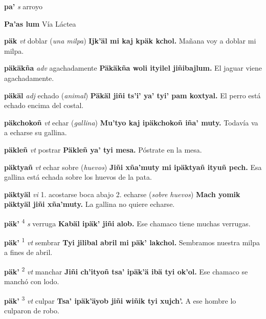 \documentclass[10pt]{scrbook}
\newcommand{\entry}[1]{\textbf{#1}}
\newcommand{\onedefinition}[1]{#1.}
\newcommand{\defsuperscript}[1]{\textsuperscript{#1}}
\newcommand{\partofspeech}[1]{\textit{#1}}
\newcommand{\spanishtranslation}[1]{#1}
\newcommand{\clarification}[1]{(\textit{#1})}
\newcommand{\cholexample}[1]{\textbf{#1}}
\newcommand{\exampletranslation}[1]{#1}
\begin{document}
\begin{multicols}{2}
\entry{pa'}
\partofspeech{s}
\spanishtranslation{arroyo}

\entry{Pa'as lum}
\spanishtranslation{Vía Láctea}

\entry{päk}
\partofspeech{vt}
\spanishtranslation{doblar}
\clarification{una milpa}
\cholexample{Ijk'äl mi kaj kpäk kchol.}
\exampletranslation{Mañana voy a doblar mi milpa.}

\entry{päkäkña}
\partofspeech{adv}
\spanishtranslation{agachadamente}
\cholexample{Päkäkña woli ityilel jiñibajlum.}
\exampletranslation{El jaguar viene agachadamente.}

\entry{päkäl}
\partofspeech{adj}
\spanishtranslation{echado}
\clarification{animal}
\cholexample{Päkäl jiñi ts'i' ya' tyi' pam koxtyal.}
\exampletranslation{El perro está echado encima del costal.}

\entry{päkchokoñ}
\partofspeech{vt}
\spanishtranslation{echar}
\clarification{gallina}
\cholexample{Mu'tyo kaj ipäkchokoñ iña' muty.}
\exampletranslation{Todavía va a echarse su gallina.}

\entry{päkleñ}
\partofspeech{vt}
\spanishtranslation{postrar}
\cholexample{Päkleñ ya' tyi mesa.}
\exampletranslation{Póstrate en la mesa.}

\entry{päktyañ}
\partofspeech{vt}
\spanishtranslation{echar sobre}
\clarification{huevos}
\cholexample{Jiñi xña'muty mi ipäktyañ ityuñ pech.}
\exampletranslation{Esa gallina está echada sobre los huevos de la pata.}

\entry{päktyäl}
\partofspeech{vi}
\onedefinition{1}
\spanishtranslation{acostarse boca abajo}
\onedefinition{2}
\spanishtranslation{echarse}
\clarification{sobre huevos}
\cholexample{Mach yomik päktyäl jiñi xña'muty.}
\exampletranslation{La gallina no quiere echarse.}

\entry{päk'}
\defsuperscript{4}
\partofspeech{s}
\spanishtranslation{verruga}
\cholexample{Kabäl ipäk' jiñi alob.}
\exampletranslation{Ese chamaco tiene muchas verrugas.}

\entry{päk'}
\defsuperscript{1}
\partofspeech{vt}
\spanishtranslation{sembrar}
\cholexample{Tyi jilibal abril mi päk' lakchol.}
\exampletranslation{Sembramos nuestra milpa a fines de abril.}

\entry{päk'}
\defsuperscript{2}
\partofspeech{vt}
\spanishtranslation{manchar}
\cholexample{Jiñi ch'ityoñ tsa' ipäk'ä ibä tyi ok'ol.}
\exampletranslation{Ese chamaco se manchó con lodo.}

\entry{päk'}
\defsuperscript{3}
\partofspeech{vt}
\spanishtranslation{culpar}
\cholexample{Tsa' ipäk'äyob jiñi wiñik tyi xujch'.}
\exampletranslation{A ese hombre lo culparon de robo.}


\end{multicols}
\end{document}
